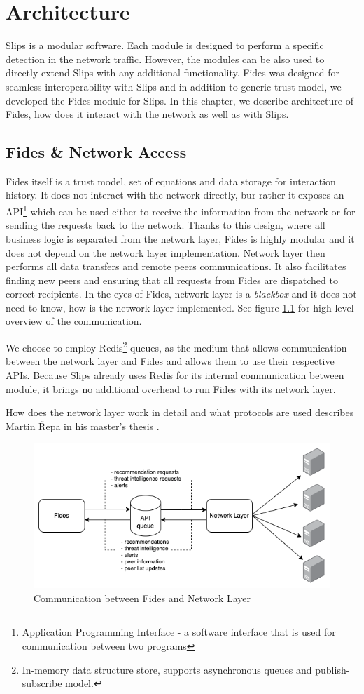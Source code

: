 \chapter{Architecture}
\label{ch:architecture}
Slips is a modular software. Each module is designed to perform a specific detection in the network traffic.\cite{slips}
However, the modules can be also used to directly extend Slips with any additional functionality. 
Fides was designed for seamless interoperability with Slips and in addition to generic trust model, we developed the Fides module for Slips.
In this chapter, we describe architecture of Fides, how does it interact with the network as well as with Slips.

\section{Fides \& Network Access}
\label{sec:fides-and-network-access}
Fides itself is a trust model, set of equations and data storage for interaction history. 
It does not interact with the network directly, bur rather it exposes an API\footnote{Application Programming Interface - a software interface that is used for communication between two programs} which can be used either to receive the information from the network or for sending the requests back to the network.
Thanks to this design, where all business logic is separated from the network layer,  Fides is highly modular and it does not depend on the network layer implementation.
Network layer then performs all data transfers and remote peers communications.
It also facilitates finding new peers and ensuring that all requests from Fides are dispatched to correct recipients.
In the eyes of Fides, network layer is a \textit{blackbox} and it does not need to know, how is the network layer implemented.
See figure \ref{fig:fides-queue-network} for high level overview of the communication.

We choose to employ Redis\footnote{In-memory data structure store, supports asynchronous queues and publish-subscribe model.} queues, as the medium that allows communication between the network layer and Fides and allows them to use their respective APIs.
Because Slips already uses Redis for its internal communication between module, it brings no additional overhead to run Fides with its network layer.

How does the network layer work in detail and what protocols are used describes Martin Řepa in his master's thesis \cite{nl}.

\begin{figure}[ht]
    \centering
    \includegraphics[width=1.0\textwidth]{assets/tl_queue_nl.png}
    \caption{Communication between Fides and Network Layer}
    \label{fig:fides-queue-network}
\end{figure}
